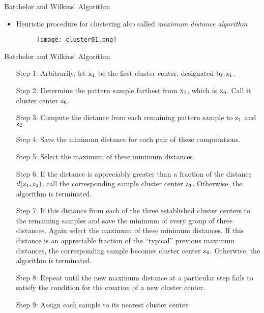 \begin{frame}{Batchelor and Wilkins' Algorithm}
\begin{itemize}
\item Heuristic procedure for clustering also called \textit{\color{slidecolor}maximum distance algorithm}
\begin{figure}
\texttt{[image: cluster01.png]}
\end{figure}
\end{itemize}
\end{frame}

\begin{frame}{Batchelor and Wilkins' Algorithm}
\begin{scriptsize}
\begin{itemize}
\item[Step 1:] Arbitrarily, let ${\rm x_1}$ be the first cluster center, designated by ${\rm z}_1$.
\item[Step 2:]Determine the pattern sample farthest from ${\rm x}_1$, which is ${\rm x}_6$. Call it cluster center ${\rm z}_6$.
\item[Step 3:] Compute the distance from each remaining pattern sample to ${\rm z}_1$ and ${\rm z}_2$
\item[Step 4:] Save the minimum distance for each pair of these computations.
\item[Step 5:] Select the maximum of these minimum distances.
\item[Step 6:] If the distance is appreciably greater than a fraction of the distance $d({\rm z}_1,{\rm z}_2)$, call the corresponding sample cluster center ${\rm z}_3$. Otherwise, the algorithm is terminated.

\item[Step 7:] If this distance from each of the three established cluster centers to the remaining samples and save the minimum of every group of three distances. Again select the maximum of these minimum distances. If this distance is an appreciable fraction of the ``typical'' previous maximum distances, the corresponding sample becomes cluster center ${\rm z}_4$. Otherwise, the algorithm is terminated.
\item[Step 8:] Repeat until the new maximum distance at a particular step fails to satisfy the condition for the creation of a new cluster center.
\item[Step 9:] Assign each sample to its nearest cluster center.
\end{itemize}
\end{scriptsize}
\end{frame}


